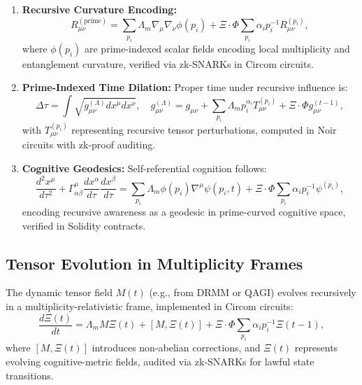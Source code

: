 \documentclass{article}
\theoremstyle{plain}
\begin{document}
\begin{enumerate}
    \item \textbf{Recursive Curvature Encoding:}
    \begin{equation}
        R_{\mu\nu}^{(\text{prime})} = \sum_{p_i} \Lambda_m \nabla_\mu \nabla_\nu \phi(p_i) + \Xi \cdot \Phi \sum_{p_i} \alpha_i p_i^{-1} R_{\mu\nu}^{(p_i)},
    \end{equation}
    where \(\phi(p_i)\) are prime-indexed scalar fields encoding local multiplicity and entanglement curvature, verified via zk-SNARKs in Circom circuits.

    \item \textbf{Prime-Indexed Time Dilation:}
    Proper time under recursive influence is:
    \begin{equation}
        \Delta \tau = \int \sqrt{g_{\mu\nu}^{(\Lambda)} dx^\mu dx^\nu}, \quad g_{\mu\nu}^{(\Lambda)} = g_{\mu\nu} + \sum_{p_i} \Lambda_m p_i^{\alpha_i} T_{\mu\nu}^{(p_i)} + \Xi \cdot \Phi g_{\mu\nu}^{(t-1)},
    \end{equation}
    with \(T_{\mu\nu}^{(p_i)}\) representing recursive tensor perturbations, computed in Noir circuits with zk-proof auditing.

    \item \textbf{Cognitive Geodesics:}
    Self-referential cognition follows:
    \begin{equation}
        \frac{d^2 x^\mu}{d\tau^2} + \Gamma^\mu_{\alpha\beta} \frac{dx^\alpha}{d\tau} \frac{dx^\beta}{d\tau} = \sum_{p_i} \Lambda_m \phi(p_i) \nabla^\mu \psi(p_i, t) + \Xi \cdot \Phi \sum_{p_i} \alpha_i p_i^{-1} \psi^{(p_i)},
    \end{equation}
    encoding recursive awareness as a geodesic in prime-curved cognitive space, verified in Solidity contracts.
\end{enumerate}

\subsection{Tensor Evolution in Multiplicity Frames}

The dynamic tensor field \(M(t)\) (e.g., from DRMM or QAGI) evolves recursively in a multiplicity-relativistic frame, implemented in Circom circuits:
\begin{equation}
    \frac{d\Xi(t)}{dt} = \Lambda_m M \Xi(t) + [M, \Xi(t)] + \Xi \cdot \Phi \sum_{p_i} \alpha_i p_i^{-1} \Xi(t-1),
\end{equation}
where \([M, \Xi(t)]\) introduces non-abelian corrections, and \(\Xi(t)\) represents evolving cognitive-metric fields, audited via zk-SNARKs for lawful state transitions.
\end{document}
